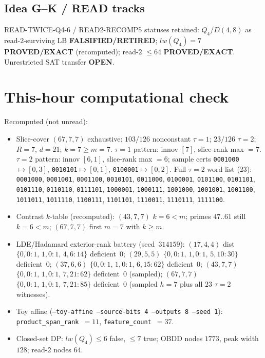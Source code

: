 \documentclass[11pt]{article}
\begin{document}
\subsection*{Idea G--K / READ tracks}
READ-TWICE-Q4-6 / READ2-RECOMP5 statuses retained: $Q_4$/$D(4,8)$ as read-$2$-surviving LB
\textbf{FALSIFIED/RETIRED}; $lw(Q_4)=7$ \textbf{PROVED/EXACT} (recomputed); read-$2$ $\le64$
\textbf{PROVED/EXACT}. Unrestricted SAT transfer \textbf{OPEN}.

\section*{This-hour computational check}
Recomputed (not unread):
\begin{itemize}
\item Slice-cover $(67,7,7)$ exhaustive: $103/126$ nonconstant $\tau{=}1$;
  $23/126$ $\tau{=}2$; $R{=}7$, $d{=}21$; $k{=}7{\ge}m{=}7$.
  $\tau{=}1$ pattern: innov $[7]$, slice-rank max $=7$.
  $\tau{=}2$ pattern: innov $[6,1]$, slice-rank max $=6$; sample certs
  \texttt{0001000}$\mapsto[0,3]$, \texttt{0010101}$\mapsto[0,1]$,
  \texttt{0100001}$\mapsto[0,2]$.
  Full $\tau{=}2$ word list (23):
  \texttt{0001000}, \texttt{0001001}, \texttt{0001100}, \texttt{0010101},
  \texttt{0011000}, \texttt{0100001}, \texttt{0101100}, \texttt{0101101},
  \texttt{0101110}, \texttt{0110110}, \texttt{0111101}, \texttt{1000001},
  \texttt{1000111}, \texttt{1001000}, \texttt{1001001}, \texttt{1001100},
  \texttt{1011011}, \texttt{1011110}, \texttt{1100111}, \texttt{1101101},
  \texttt{1110011}, \texttt{1110111}, \texttt{1111100}.
\item Contrast $k$-table (recomputed): $(43,7,7)$ $k{=}6{<}m$; primes $47..61$ still $k{=}6{<}m$;
  $(67,7,7)$ first $m{=}7$ with $k{\ge}m$.
\item LDE/Hadamard exterior-rank battery (seed~$314159$):
  $(17,4,4)$ dist $\{0,0{:}1,\,1,0{:}1,\,4,6{:}14\}$ deficient~$0$;
  $(29,5,5)$ $\{0,0{:}1,\,1,0{:}1,\,5,10{:}30\}$ deficient~$0$;
  $(37,6,6)$ $\{0,0{:}1,\,1,0{:}1,\,6,15{:}62\}$ deficient~$0$;
  $(43,7,7)$ $\{0,0{:}1,\,1,0{:}1,\,7,21{:}62\}$ deficient~$0$ (sampled);
  $(67,7,7)$ $\{0,0{:}1,\,1,0{:}1,\,7,21{:}85\}$ deficient~$0$
  (sampled $h{=}7$ plus all $23$ $\tau{=}2$ witnesses).
\item Toy affine (\texttt{--toy-affine --source-bits 4 --outputs 8 --seed 1}):
  \texttt{product\_span\_rank}~$=11$, \texttt{feature\_count}~$=37$.
\item Closed-set DP: $lw(Q_4)\le6$ false, $\le7$ true; OBDD nodes $1773$, peak width $128$;
  read-$2$ nodes $64$.
\end{itemize}
\end{document}

